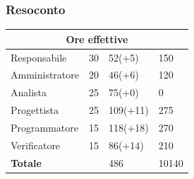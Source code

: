 \documentclass[9pt]{article}
\begin{document}
\subsubsection{Resoconto}
\begin{center}
	\begin{tabularx}{\textwidth}{|X|X|X|X|}
		\hline														
		\multicolumn{4}{|c|}{\textbf{Ore effettive}}                                      \\														
		\hline														
		Responsabile		&		30		&		52(+5)		&		150		\\
		\hline														
		Amministratore		&		20		&		46(+6)		&		120		\\
		\hline														
		Analista		&		25		&		75(+0)		&		0		\\
		\hline														
		Progettista		&		25		&		109(+11)		&		275		\\
		\hline														
		Programmatore		&		15		&		118(+18)		&		270		\\
		\hline														
		Verificatore		&		15		&		86(+14)		&		210		\\
		\hline														
		\hline														
		\textbf{Totale}		&				&		486		&		10140		\\
		\hline														
																																							
	\end{tabularx}\\[8pt]
	\mbox{}\\
\end{center}
\end{document}

